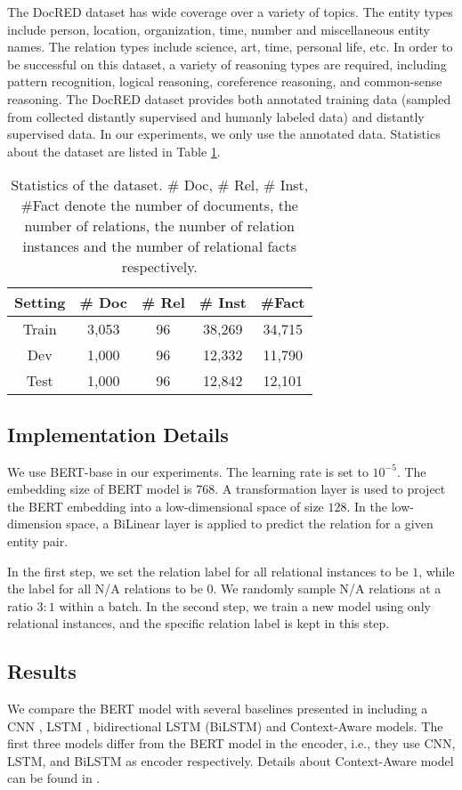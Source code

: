 \documentclass[11pt,a4paper]{article}
\begin{document}
The DocRED dataset has wide coverage over a variety of topics. The entity types include person, location, organization, time, number and miscellaneous entity names. The relation types include science, art, time, personal life, etc. In order to be successful on this dataset, a variety of reasoning types are required, including pattern recognition, logical reasoning, coreference reasoning, and common-sense reasoning. The DocRED dataset provides both annotated training data (sampled from collected distantly supervised and humanly labeled data) and distantly supervised data. In our experiments, we only use the annotated data. Statistics about the dataset are listed in Table \ref{tab:statics}.

\begin{table}[]
    \centering
    \begin{tabular}{c|c|c|c|c}
    \toprule
        Setting & \# Doc & \# Rel & \# Inst & \#Fact \\\midrule
        Train & 3,053 & 96 & 38,269 & 34,715 \\
        Dev & 1,000 & 96 & 12,332 & 11,790 \\
        Test & 1,000 & 96 & 12,842 & 12,101\\\bottomrule
    \end{tabular}
    \caption{Statistics of the dataset. \# Doc,  \# Rel, \# Inst, \#Fact denote the number of documents, the number of relations, the number of relation instances and the number of relational facts respectively.}
    \label{tab:statics}
\end{table}

\subsection{Implementation Details}
We use BERT-base in our experiments. The learning rate is set to $10^{-5}$. The embedding size of BERT model is $768$. A transformation layer is used to project the BERT embedding into a low-dimensional space of size $128$. In the low-dimension space, a BiLinear layer is applied to predict the relation for a given entity pair.

In the first step, we set the relation label for all relational instances to be $1$, while the label for all N/A relations to be $0$. We randomly sample N/A relations at a ratio $3:1$ within a batch. In the second step, we train a new model using only relational instances, and the specific relation label is kept in this step.

\subsection{Results}
We compare the BERT model with several baselines presented in \cite{yao2019DocRED} including a CNN \cite{CNN}, LSTM \cite{BiLSTM}, bidirectional LSTM (BiLSTM) \cite{BiLSTM_RE} and Context-Aware models.
The first three models differ from the BERT model in the encoder, i.e., they use CNN, LSTM, and BiLSTM as encoder respectively. Details about Context-Aware model can be found in \cite{Context_aware}.
\end{document}
